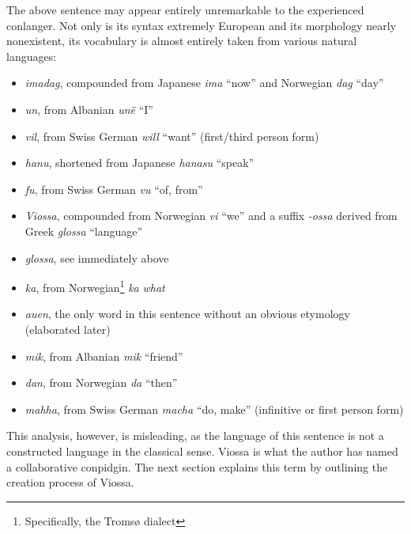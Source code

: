 \documentclass[a4paper,abstracton]{scrartcl}
\newcommand{\en}[1]{``#1''}
\newcommand{\vp}[1]{\emph{#1}}
\newcommand{\orig}[1]{\emph{#1}}
\begin{document}
The above sentence may appear entirely unremarkable to the experienced conlanger. Not only is its syntax extremely European and its morphology nearly nonexistent, its vocabulary is almost entirely taken from various natural languages:
\begin{itemize}
\item \vp{imadag}, compounded from Japanese \orig{ima} \en{now} and Norwegian \orig{dag} \en{day}
\item \vp{un}, from Albanian \orig{unë} \en{I}
\item \vp{vil}, from Swiss German \orig{will} \en{want} (first/third person form)
\item \vp{hanu}, shortened from Japanese \orig{hanasu} \en{speak} 
\item \vp{fu}, from Swiss German \orig{vu} \en{of, from}
\item \vp{Viossa}, compounded from Norwegian \orig{vi} \en{we} and a suffix \vp{-ossa} derived from Greek \orig{glossa} \en{language}
\item \vp{glossa}, see immediately above
\item \vp{ka}, from Norwegian\footnote{Specifically, the Tromsø dialect} \orig{ka} \vp{what}
\item \vp{auen}, the only word in this sentence without an obvious etymology (elaborated later)
\item \vp{mik}, from Albanian \orig{mik} \en{friend}
\item \vp{dan}, from Norwegian \orig{da} \en{then}
\item \vp{mahha}, from Swiss German \orig{macha} \en{do, make} (infinitive or first person form)
\end{itemize}

This analysis, however, is misleading, as the language of this sentence is not a constructed language in the classical sense. Viossa is what the author has named a collaborative conpidgin. The next section explains this term by outlining the creation process of Viossa.
\end{document}
